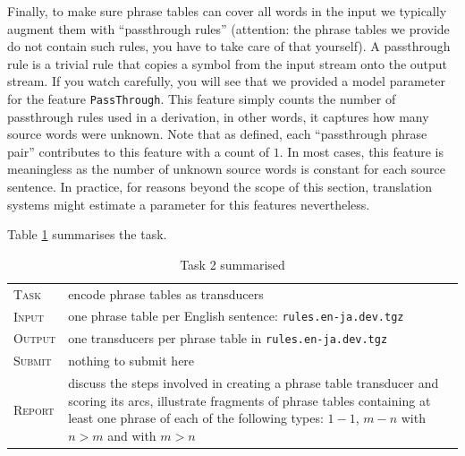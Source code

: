 Finally, to make sure phrase tables can cover all words in the input we typically augment them with ``passthrough rules'' (attention: the phrase tables we provide do not contain such rules, you have to take care of that yourself).
A passthrough rule is a trivial rule that copies a symbol from the input stream onto the output stream. 
If you watch carefully, you will see that we provided a model parameter for the feature \texttt{PassThrough}.
This feature simply counts the number of passthrough rules used in a derivation, in other words, it captures how many source words were unknown. 
Note that as defined, each ``passthrough phrase pair'' contributes to this feature with a count of $1$.
In most cases, this feature is meaningless as the number of unknown source words is constant for each source sentence. 
In practice, for reasons beyond the scope of this section, translation systems might estimate a parameter for this features nevertheless.

Table \ref{tab:task2} summarises the task. 

\begin{table}[h]\centering
\begin{tabular}{l p{12cm}}
\textsc{Task}   &  encode phrase tables as transducers \\
\textsc{Input}  &  one phrase table per English sentence: \texttt{rules.en-ja.dev.tgz} \\
\textsc{Output} &  one transducers per phrase table in \texttt{rules.en-ja.dev.tgz} \\
\textsc{Submit} &  nothing to submit here\\
\textsc{Report} & discuss the steps involved in creating a phrase table transducer and scoring its arcs, illustrate fragments of phrase tables containing at least one phrase of each of the following types: $1-1$, $m-n$ with $n > m$ and with $m > n$\\
\end{tabular}
\caption{\label{tab:task2}Task 2 summarised}
\end{table}

